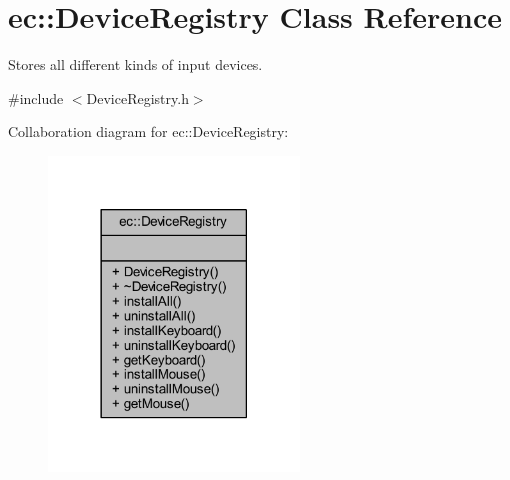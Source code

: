 \hypertarget{classec_1_1_device_registry}{}\section{ec\+:\+:Device\+Registry Class Reference}
\label{classec_1_1_device_registry}


Stores all different kinds of input devices.  




{\ttfamily \#include $<$Device\+Registry.\+h$>$}



Collaboration diagram for ec\+:\+:Device\+Registry\+:\nopagebreak
\begin{figure}[H]
\begin{center}
\leavevmode
\includegraphics[width=189pt]{classec_1_1_device_registry__coll__graph}
\end{center}
\end{figure}
